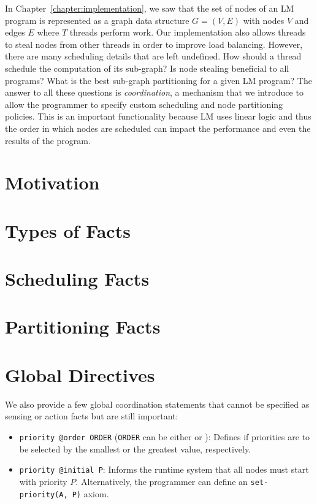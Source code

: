 In Chapter~\ref{chapter:implementation}, we saw that the set of nodes
of an LM program is represented as a graph data structure $G = (V, E)$ with nodes $V$
and edges $E$ where $T$ threads perform work. Our implementation also allows
threads to steal nodes from other threads in order to improve load balancing.
However, there are many scheduling details that are left undefined. How should a
thread schedule the computation of its sub-graph? Is node stealing beneficial to
all programs? What is the best sub-graph partitioning for a given LM program?
The answer to all these questions is \emph{coordination}, a mechanism that we
introduce to allow the programmer to specify custom scheduling and node
partitioning policies. This is an important functionality because LM uses linear
logic and thus the order in which nodes are scheduled can impact the performance
and even the results of the program.

\section{Motivation}\label{section:coord:rationale}



\section{Types of Facts}



\section{Scheduling Facts}\label{sec:coord:fifo}



\section{Partitioning Facts}


\section{Global Directives}

We also provide a few global coordination statements that cannot be specified
as sensing or action facts but are still important:

\begin{itemize}

   \item \texttt{priority @order ORDER} (\texttt{ORDER} can be either 
      or ): Defines if priorities are to be selected by the smallest
      or the greatest value, respectively.

   \item \texttt{priority @initial P}: Informs the runtime system that all nodes
      must start with priority $P$.  Alternatively, the programmer can define an
      \texttt{set-priority(A, P)} axiom.

\end{itemize}

